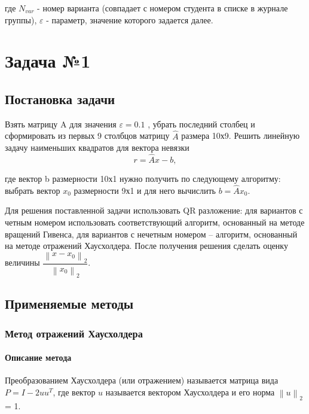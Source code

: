 \documentclass[a4paper]{article}
\begin{document}
где $N_{var}$ - номер варианта (совпадает с номером студента в списке в журнале группы), $\varepsilon$  - параметр, значение которого задается далее.

\newpage

\section{Задача №1}

\subsection{Постановка задачи}
Взять матрицу A  для значения $\varepsilon = 0.1$ , убрать последний столбец и сформировать из первых 9 столбцов матрицу $\hat{A}$  размера 10х9. Решить линейную задачу наименьших квадратов для вектора невязки
\begin{equation*}
r = \hat{A} x - b,
\end{equation*}

где вектор b размерности 10х1 нужно получить по следующему алгоритму: выбрать вектор $x_0$  размерности 9х1 и для него вычислить $b = \hat{A} x_0$.

Для решения поставленной задачи использовать QR разложение: для вариантов с четным номером использовать соответствующий алгоритм, основанный на методе вращений Гивенса, для вариантов с нечетным номером – алгоритм, основанный на методе отражений Хаусхолдера. 
После получения решения сделать оценку величины $\dfrac{\left \| x - x_0 \right \|_{2}} {\left \| x_0 \right \|_{2}}$.

\newpage

\subsection{Применяемые методы}

\subsubsection{Метод отражений Хаусхолдера}

\paragraph{Описание метода}

Преобразованием Хаусхолдера (или отражением) называется матрица вида $P = I - 2 u u^{T}$, где вектор $u$ называется вектором Хаусхолдера и его норма $\left \| u \right \|_2$ = 1. 
\end{document}
